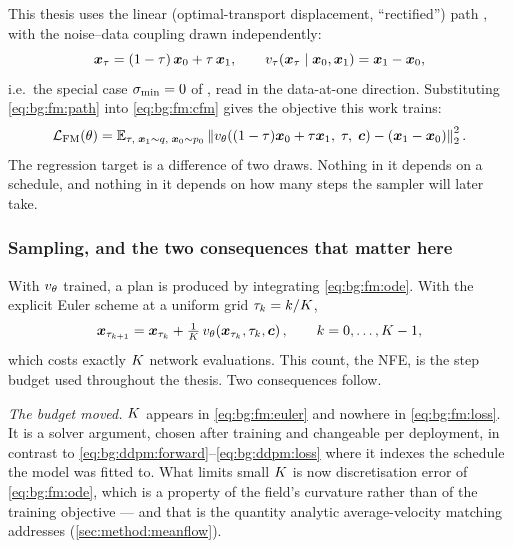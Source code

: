 This thesis uses the linear (optimal-transport displacement, ``rectified'')
path \parencite{lipman2023flow,liu2023flow}, with the noise--data coupling drawn independently:
\begin{equation}\label{eq:bg:fm:path}
  \boldsymbol{x}_{\tau} = (1-\tau)\,\boldsymbol{x}_{0} + \tau\,\boldsymbol{x}_{1},
  \qquad
  v_{\tau}(\boldsymbol{x}_{\tau}\mid \boldsymbol{x}_{0},\boldsymbol{x}_{1}) = \boldsymbol{x}_{1} - \boldsymbol{x}_{0},
\end{equation}
i.e.\ the special case $\sigma_{\textrm{min}} = 0$ of \parencite[Eq.~(20)--(23)]{lipman2023flow}, read in
the data-at-one direction. Substituting \eqref{eq:bg:fm:path} into \eqref{eq:bg:fm:cfm} gives
the objective this work trains:
\begin{equation}\label{eq:bg:fm:loss}
  \mathcal{L}_{\textrm{FM}}(\theta)
  = \mathbb{E}_{\tau,\;\boldsymbol{x}_{1}\sim q,\;\boldsymbol{x}_{0}\sim p_{0}}
    \left\|v_{\theta}\!\left((1-\tau)\boldsymbol{x}_{0} + \tau\boldsymbol{x}_{1},\;\tau,\;\boldsymbol{c}\right)
      - \left(\boldsymbol{x}_{1}-\boldsymbol{x}_{0}\right)\right\|_{2}^{2}.
\end{equation}
The regression target is a difference of two draws. Nothing in it depends on a schedule, and
nothing in it depends on how many steps the sampler will later take.

\subsubsection*{Sampling, and the two consequences that matter here}

With $v_{\theta}$ trained, a plan is produced by integrating \eqref{eq:bg:fm:ode}. With
the explicit Euler scheme at a uniform grid $\tau_{k} = k/K$,
\begin{equation}\label{eq:bg:fm:euler}
  \boldsymbol{x}_{\tau_{k+1}} = \boldsymbol{x}_{\tau_{k}}
    + \tfrac{1}{K}\,v_{\theta}\!\left(\boldsymbol{x}_{\tau_{k}},\tau_{k},\boldsymbol{c}\right),
  \qquad k = 0,\dots,K-1,
\end{equation}
which costs exactly $K$ network evaluations. This count, the \ac{NFE}, is the step budget used
throughout the thesis. Two consequences follow.

\emph{The budget moved.} $K$ appears in \eqref{eq:bg:fm:euler} and nowhere in
\eqref{eq:bg:fm:loss}. It is a solver argument, chosen after training and changeable per
deployment, in contrast to \eqref{eq:bg:ddpm:forward}--\eqref{eq:bg:ddpm:loss} where it
indexes the schedule the model was fitted to. What limits small $K$ is now discretisation
error of \eqref{eq:bg:fm:ode}, which is a property of the field's curvature rather than of the
training objective --- and that is the quantity analytic average-velocity matching addresses
(\autoref{sec:method:meanflow}).

